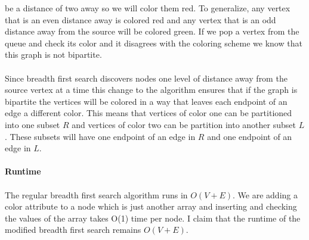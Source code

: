 \documentclass[12pt]{article}
\begin{document}
\begin{enumerate}
\begin{enumerate}
			be a distance of two away so we will color them red.  To generalize, any vertex that is an even distance away is colored red and any vertex that is an odd distance away from the source
			will be colored green.  If we pop a vertex from the queue and check its color and it disagrees with the coloring scheme we know that this graph is not bipartite.\\			
			\\
			Since breadth first search discovers nodes one level of distance away from the source vertex at a time this change to the algorithm ensures 
			that if the graph is bipartite the vertices will be colored in a way that leaves each endpoint of an edge a different color.
			This means that vertices of color one can be partitioned into one subset $R$ and vertices of color two can be partition into another subset $L$.  
			These subsets will have one endpoint of an edge in $R$ and one endpoint of an edge in $L$.\\
			\\
			\textbf{Runtime}\\
			\\
			The regular breadth first search algorithm runs in $O(V+E)$.  
			We are adding a color attribute to a node which is just another array and inserting and checking the values of the array takes O(1) time per node.  
			I claim that the runtime of the modified breadth first search remains $O(V+E)$.
		\end{enumerate}
		

\end{enumerate}
\end{document}
